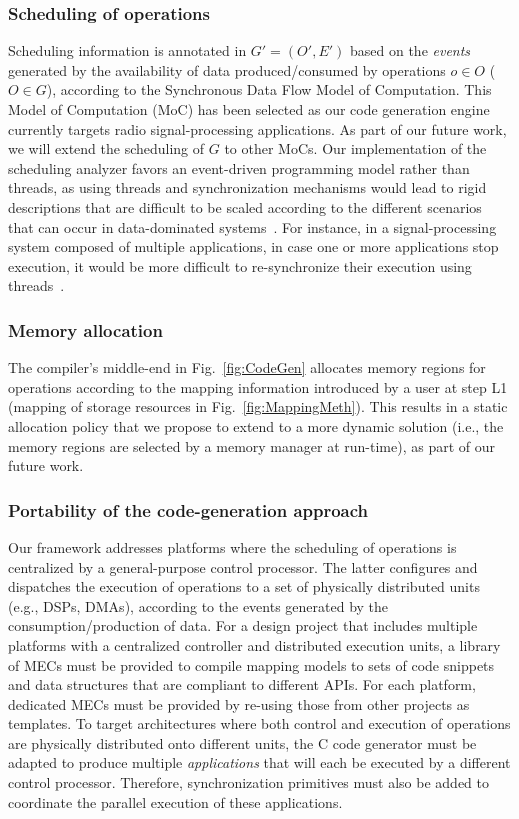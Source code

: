 \documentclass{llncs}
\begin{document}
\subsubsection{Scheduling of operations}
%
Scheduling information is annotated in $G' = (O',E')$ based on the \textit{events} generated by the
availability of data produced/consumed by operations $o \in O$ ($O \in G$), according to the Synchronous Data Flow Model of
Computation. This Model of Computation (MoC) has been selected as our code generation engine currently targets radio
signal-processing applications. As part of our future work, we will extend the scheduling of $G$ to other MoCs. Our
implementation of the scheduling analyzer favors an event-driven programming model rather than threads, as using threads
and synchronization mechanisms would lead to rigid descriptions that are difficult to be scaled according to the
different scenarios that can occur in data-dominated systems~\cite{Ousterhout96,Dabek02}. For instance, in a
signal-processing system composed of multiple applications, in case one or more applications stop execution, it would be
more difficult to re-synchronize their execution using threads~\cite{Lee06}.
%
\subsubsection{Memory allocation}
%
The compiler's middle-end in Fig.~\ref{fig:CodeGen} allocates memory regions for operations according to the mapping
information introduced by a user at step L1 (mapping of storage resources in Fig.~\ref{fig:MappingMeth}). This results
in a static allocation policy that we propose to extend to a more dynamic solution (i.e., the memory regions are
selected by a memory manager at run-time), as part of our future work.
%
\subsubsection{Portability of the code-generation approach}
%
Our framework addresses platforms where the scheduling of operations is centralized by a general-purpose control
processor. The latter configures and dispatches the execution of operations to a set of physically distributed units
(e.g., DSPs, DMAs), according to the events generated by the consumption/production of data. For a design project that
includes multiple platforms with a centralized controller and distributed execution units, a library of MECs must be
provided to compile mapping models to sets of code snippets and data structures that are compliant to different APIs.
For each platform, dedicated MECs must be provided by re-using those from other projects as templates. To target
architectures where both control and execution of operations are physically distributed onto different units, the C code
generator must be adapted to produce multiple \textit{applications} that will each be executed by a different
control processor. Therefore, synchronization primitives must also be added to coordinate the parallel execution of
these applications.
%
%
\end{document}
